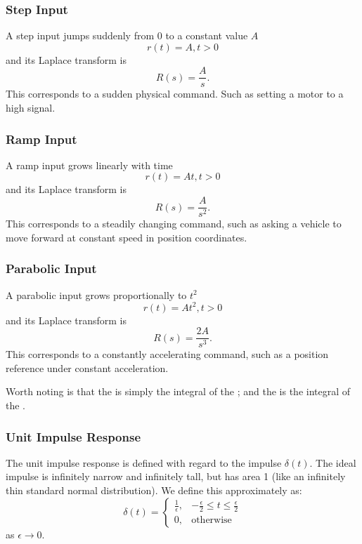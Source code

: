 \subsubsection{Step Input} \label{sec:step}
A step input jumps suddenly from 0 to a constant value $A$
\begin{equation*}
  r(t) = A, t >0
\end{equation*}
and its Laplace transform is
\begin{equation*}
  R(s) = \frac{A}{s}
.\end{equation*}
This corresponds to a sudden physical command. Such as setting a motor to a high signal.

\subsubsection{Ramp Input} \label{sec:ramp}
A ramp input grows linearly with time
\begin{equation*}
  r(t) = At, t>0
\end{equation*}
and its Laplace transform is
\begin{equation*}
  R(s) = \frac{A}{s^2}
.\end{equation*}
This corresponds to a steadily changing command, such as asking a vehicle to move forward at constant speed in position coordinates.

\subsubsection{Parabolic Input} \label{sec:par}
A parabolic input grows proportionally to $t^2$
\begin{equation*}
  r(t) = At^2, t>0
\end{equation*}
and its Laplace transform is
\begin{equation*}
  R(s) = \frac{2A}{s^3}
.\end{equation*}
This corresponds to a constantly accelerating command, such as a position reference under constant acceleration.

Worth noting is that the  is simply the integral of the ; and the  is the integral of the .

\subsubsection{Unit Impulse Response}
The unit impulse response is defined with regard to the impulse $\delta(t)$.
The ideal impulse is infinitely narrow and infinitely tall, but has area 1 (like an infinitely thin standard normal distribution).
We define this approximately as:
\begin{equation*}
  \delta(t) = \begin{cases}
    \frac{1}{\epsilon}, & - \frac{\epsilon}{2} \leq t \leq \frac{\epsilon}{2}\\
  0, & \text{otherwise}
  \end{cases}
\end{equation*}
as $\epsilon \to 0$.

